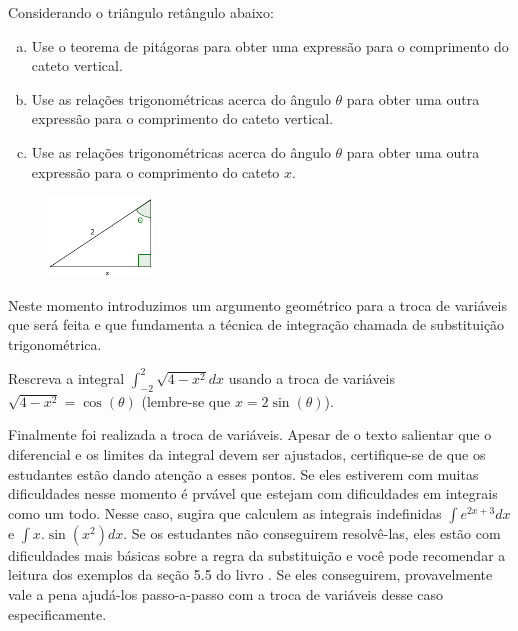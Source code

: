 \documentclass[main_estudante.tex]{subfiles}
\begin{document}
\begin{questao}
Considerando o triângulo retângulo abaixo:
\begin{enumerate}[a)]
\item Use o teorema de pitágoras para obter uma expressão para o comprimento do cateto vertical.
\item Use as relações trigonométricas acerca do ângulo $\theta$ para obter uma outra expressão para o comprimento do cateto vertical.
\item Use as relações trigonométricas acerca do ângulo $\theta$ para obter uma outra expressão para o comprimento do cateto $x$.
\end{enumerate}
\end{questao}

\begin{figure}[h]
\centering
\includegraphics[width=0.25\textwidth]{./img/l2q4.png}
\end{figure}

Neste momento introduzimos um argumento geométrico para a troca de variáveis que será feita e que fundamenta a técnica de integração chamada de substituição trigonométrica.

\begin{questao}
Rescreva a integral $\int_{-2}^{2} \sqrt{4-x^2}dx$ usando a troca de variáveis $\sqrt{4-x^2}=\cos(\theta)$ (lembre-se que $x=2\sin(\theta)$).
\end{questao}

Finalmente foi realizada a troca de variáveis. Apesar de o texto salientar que o diferencial e os limites da integral devem ser ajustados, certifique-se de que os estudantes estão dando atenção a esses pontos. Se eles estiverem com muitas dificuldades nesse momento é prvável que estejam com dificuldades em integrais como um todo. Nesse caso, sugira que calculem as integrais indefinidas $\int e^{2x+3}dx$ e $\int x.\sin(x^2)dx$. Se os estudantes não conseguirem resolvê-las, eles estão com dificuldades mais básicas sobre a regra da substituição e você pode recomendar a leitura dos exemplos da seção 5.5 do livro . Se eles conseguirem, provavelmente vale a pena ajudá-los passo-a-passo com a troca de variáveis desse caso especificamente.
\end{document}
